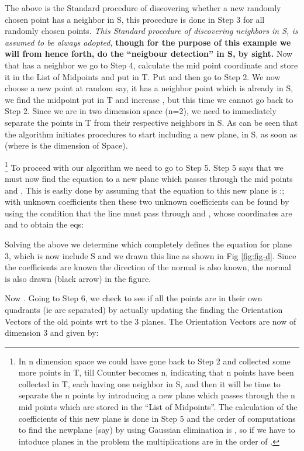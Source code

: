 \documentclass[english]{article}
\begin{document}
The above is the Standard procedure of discovering whether a new randomly
chosen point has a neighbor in S, this procedure is done in Step
3 for all randomly chosen points. \textit{This Standard procedure
of discovering neighbors in S, is assumed to be always adopted,} \textbf{
though for the purpose of this example we will from hence forth, do
the {}``neigbour detection'' in S, by sight. }Now that  has
a neighbor we go to Step 4, calculate the mid point coordinate  and
store it in the List of Midpoints and put  in T. Put 
and then go to Step 2. We now choose a new point at random say, 
it has a neighbor point  which is already in S, we find the
midpoint  put  in T and increase , 
but this time we cannot go back to Step 2. Since we are in two dimension
space (n=2), we need to immediately separate the points in T from
their respective neighbors in S. As can be seen that the algorithm initiates procedures to start including a new plane, in S, as soon as  (where  is the dimension of Space).

\footnote{In n dimension space we could have gone back to Step 2 and collected
some more points in T, till Counter becomes n, indicating that n points
have been collected in T, each having one neighbor in S, and then
it will be time to separate the n points by introducing a new plane
which passes through the n mid points  which
are stored in the {}``List of Midpoints''. The calculation of the
coefficients of this new plane is done in Step 5 and  the order of computations
to find the newplane (say) by using Gaussian elimination is ,
so if we have to intoduce  planes in the problem the multiplications
are in the order of .}
To proceed with our algorithm we need to go to Step 5. Step 5 says
that we must now find the equation to a new plane which passes through
the mid points  and , This is easliy done by assuming
that the equation to this new plane is :;
with unknown coefficients  then these two
unknown coefficients can be found by using the condition that the
line must pass through and , whose coordinates are
 and  to obtain the eqs:







Solving the above we determine  which completely
defines the equation for plane 3,  which is now include S and  we drawn this line as shown in Fig \ref{fig:fig-d}. Since the coefficients  are known the direction of the normal is also known, the normal is also drawn (black arrow) in the figure.

Now . Going to Step 6, we check to see if all the points
are in their own quadrants (ie are separated) by actually updating
the finding the Orientation Vectors of the old points wrt to the 3
planes. The Orientation Vectors are now of dimension 3 and given by:
\end{document}
